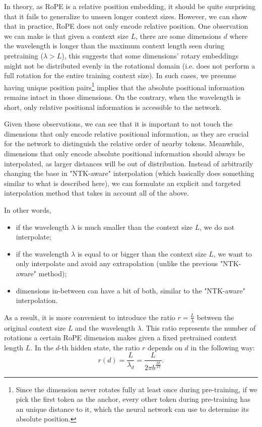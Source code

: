 \documentclass{article} %
\begin{document}
In theory, as RoPE is a relative position embedding, it should be quite surprising that it fails to generalize to unseen longer context sizes. However, we can show that in practice, RoPE does not only encode relative position. One observation we can make is that given a context size $L$, there are some dimensions $d$ where the wavelength is longer than the maximum context length seen during pretraining ($\lambda > L$), this suggests that some dimensions' rotary embeddings might not be distributed evenly in the rotational domain (i.e. does not perform a full rotation for the entire training context size). In such cases, we presume having unique position pairs\footnote{Since the dimension never rotates fully at least once during pre-training, if we pick the first token as the anchor, every other token during pre-training has an unique distance to it, which the neural network can use to determine its absolute position.} implies that the absolute positional information remains intact in those dimensions. On the contrary, when the wavelength is short, only relative positional information is accessible to the network.

Given these observations, we can see that it is important to not touch the dimensions that only encode relative positional information, as they are crucial for the network to distinguish the relative order of nearby tokens. Meanwhile, dimensions that only encode absolute positional information should always be interpolated, as larger distances will be out of distribution. Instead of arbitrarily changing the base in "NTK-aware" interpolation (which basically does something similar to what is described here), we can formulate an explicit and targeted interpolation method that takes in account all of the above.


In other words,

\begin{itemize}
\item if the wavelength $\lambda$ is much smaller than the context size $L$, we do not interpolate; 
\item if the wavelength $\lambda$ is equal to or bigger than the context size $L$, we want to only interpolate and avoid any extrapolation (unlike the previous "NTK-aware" method);
\item dimensions in-between can have a bit of both, similar to the "NTK-aware" interpolation.
\end{itemize}

As a result, it is more convenient to introduce the ratio $r = \frac{L}{\lambda}$ between the original context size $L$ and the wavelength $\lambda$. This ratio represents the number of rotations a certain RoPE dimension makes given a fixed pretrained context length $L$.
In the $d$-th hidden state, the ratio $r$ depends on $d$ in the following way:
\begin{equation}
    r(d) = \dfrac{L}{\lambda_d} = \dfrac{L}{2\pi b^{\frac{2d}{|D|}}}.
\end{equation}
\end{document}
